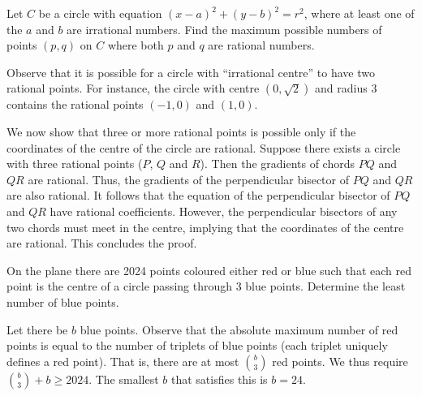 \begin{question}[2]\label{Q::2024-O-1-21}
    Let $C$ be a circle with equation $(x-a)^2 + (y-b)^2 = r^2$, where at least one of the $a$ and $b$ are irrational numbers. Find the maximum possible numbers of points $(p,q)$ on $C$ where both $p$ and $q$ are rational numbers.
\end{question}
\begin{solution*}
    Observe that it is possible for a circle with ``irrational centre'' to have two rational points. For instance, the circle with centre $(0, \sqrt2)$ and radius 3 contains the rational points $(-1, 0)$ and $(1, 0)$. 

    We now show that three or more rational points is possible only if the coordinates of the centre of the circle are rational. Suppose there exists a circle with three rational points ($P$, $Q$ and $R$). Then the gradients of chords $PQ$ and $QR$ are rational. Thus, the gradients of the perpendicular bisector of $PQ$ and $QR$ are also rational. It follows that the equation of the perpendicular bisector of $PQ$ and $QR$ have rational coefficients. However, the perpendicular bisectors of any two chords must meet in the centre, implying that the coordinates of the centre are rational. This concludes the proof.
\end{solution*}

\begin{question}[24]\label{Q::2024-O-1-22}
    On the plane there are 2024 points coloured either red or blue such that each red point is the centre of a circle passing through 3 blue points. Determine the least number of blue points.
\end{question}
\begin{solution*}
    Let there be $b$ blue points. Observe that the absolute maximum number of red points is equal to the number of triplets of blue points (each triplet uniquely defines a red point). That is, there are at most $\binom{b}{3}$ red points. We thus require $\binom{b}{3} + b \geq 2024$. The smallest $b$ that satisfies this is $b = 24$.
\end{solution*}

